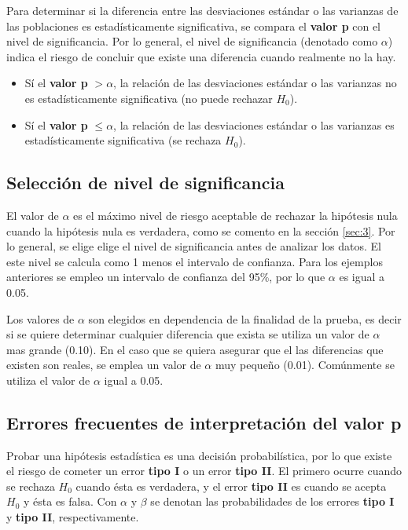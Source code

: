 \documentclass{article}
\begin{document}
 Para determinar si la diferencia entre las desviaciones estándar o las varianzas de las poblaciones es estadísticamente significativa, se compara el \textbf{valor p} con el nivel de significancia. Por lo general, el nivel de significancia (denotado como $\alpha$) indica el riesgo de concluir que existe una diferencia cuando realmente no la hay.
 \begin{itemize}
   \item Sí el \textbf{valor p} $> \alpha $, la relación de las desviaciones estándar o las varianzas no es estadísticamente significativa (no puede rechazar $H_{0}$).
   
     \item Sí el \textbf{valor p} $\leq \alpha $, la relación de las desviaciones estándar o las varianzas es estadísticamente significativa (se rechaza $H_{0}$).
   
 \end{itemize}
 
 

\subsection{Selección de nivel de significancia}
\label{sec:4}
El valor de $\alpha$ es el máximo nivel de riesgo aceptable de rechazar la hipótesis nula cuando la hipótesis nula es verdadera, como se comento en la sección \ref{sec:3}. Por lo general, se elige elige el nivel de significancia antes de analizar los datos. El este nivel se calcula como 1 menos el intervalo de confianza. Para los ejemplos anteriores se empleo un intervalo de confianza del 95\%, por lo que $\alpha$ es igual a 0.05.

Los valores de $\alpha$ son elegidos en dependencia de la finalidad de la prueba, es decir si se quiere determinar cualquier diferencia que exista se utiliza un valor de $\alpha$ mas grande (0.10). En el caso que se quiera asegurar que el las diferencias que existen son reales, se emplea un valor de $\alpha$ muy pequeño (0.01). Comúnmente se utiliza el valor de $\alpha$ igual a 0.05. 

\subsection{Errores frecuentes de interpretación del \textbf{valor p}}
\label{sec:5}

Probar una hipótesis estadística es una decisión probabilística, por lo que existe el
riesgo de cometer un error \textbf{tipo I} o un error \textbf{tipo II}. El primero ocurre cuando se rechaza $H_{0}$ cuando ésta es verdadera, y el error \textbf{tipo II} es cuando se acepta $H_{0}$ y ésta es falsa. Con $\alpha$ y $\beta$ se denotan las probabilidades de los errores \textbf{tipo I} y \textbf{tipo II}, respectivamente.
\end{document}
